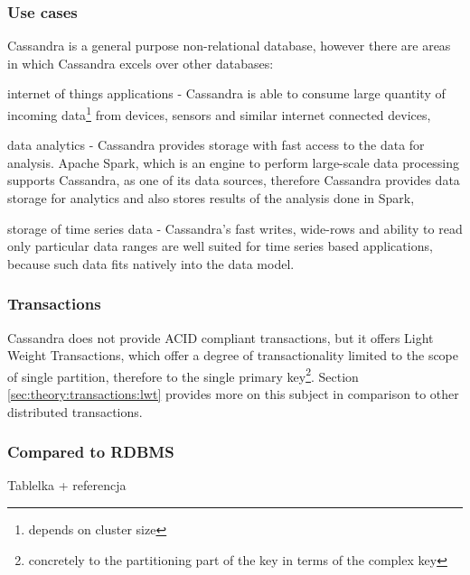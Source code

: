 \subsubsection{Use cases}
Cassandra is a general purpose non-relational database, however there are areas in which Cassandra excels over other databases:
\begin{enumerate*}
\item internet of things applications - Cassandra is able to consume large quantity of incoming data\footnote{depends on cluster size} from devices, sensors and similar internet connected devices,
\item data analytics - Cassandra provides storage with fast access to the data for analysis. Apache Spark, which is an engine to perform large-scale data processing \cite{ApacheSpark} supports Cassandra, as one of its data sources, therefore Cassandra provides data storage for analytics and also stores results of the analysis done in Spark,
\item storage of time series data - Cassandra's fast writes, wide-rows and ability to read only particular data ranges are well suited for time series based applications, because such data fits natively into the data model.
\end{enumerate*} 

\subsubsection{Transactions}
Cassandra does not provide ACID compliant transactions, but it offers Light Weight Transactions, which offer a degree of transactionality limited to the scope of single partition, therefore to the single primary key\footnote{concretely to the partitioning part of the key in terms of the complex key}. Section \ref{sec:theory:transactions:lwt} provides more on this subject in comparison to other distributed transactions. 

\subsubsection{Compared to RDBMS}
Tablelka + referencja

